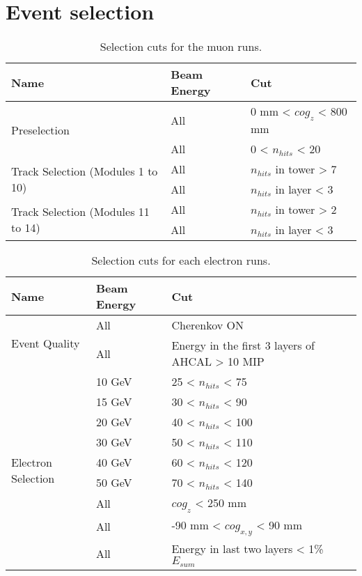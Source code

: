 \chapter{Event selection}
\label{appendix:evt_selection}

\begin{table}[htb!]
	\centering
	\caption{Selection cuts for the muon runs.}
	\label{table:muon_sel}
	\begin{tabular}{@{}lll@{}}
		\toprule
		\multicolumn{1}{l}{\textbf{Name}} & \textbf{Beam Energy} & \textbf{Cut}\\
		\midrule
		\multirow{2}{*}{Preselection}& All & 0 mm < $cog_{z}$ < 800 mm\\& All & 0 < $n_{hits}$ < 20 \\
		\midrule
		\multirow{2}{*}{Track Selection (Modules 1 to 10)}& All & $n_{hits}$ in tower > 7 \\& All & $n_{hits}$ in layer < 3 \\
		\midrule
		\multirow{2}{*}{Track Selection (Modules 11 to 14)}& All & $n_{hits}$ in tower > 2 \\& All & $n_{hits}$ in layer < 3 \\
		\bottomrule
	\end{tabular}
\end{table}

\begin{table}[htb!]
	\centering
	\caption{Selection cuts for each electron runs.}
	\label{table:electron_sel}
	\begin{tabular}{@{}lll@{}}
		\toprule
		\multicolumn{1}{l}{\textbf{Name}} & \textbf{Beam Energy} & \textbf{Cut}\\
		\midrule
		\multirow{2}{*}{Event Quality}& All & Cherenkov ON\\& All & Energy in the first 3 layers of AHCAL > 10 MIP \\
		\midrule
		\multirow{9}{*}{Electron Selection}& 10 GeV & 25 < $n_{hits}$ < 75 \\& 15 GeV & 30 < $n_{hits}$ < 90 \\& 20 GeV & 40 < $n_{hits}$ < 100 \\& 30 GeV & 50 < $n_{hits}$ < 110 \\& 40 GeV & 60 < $n_{hits}$ < 120 \\& 50 GeV & 70 < $n_{hits}$ < 140 \\& All & $cog_{z}$ < 250 mm\\& All & -90 mm < $cog_{x, y}$ < 90 mm \\& All & Energy in last two layers < 1\% $E_{sum}$ \\
		\bottomrule
	\end{tabular}
\end{table}

